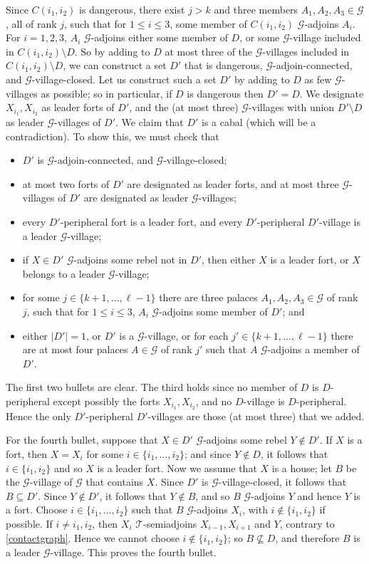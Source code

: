 \documentclass[titlepage,11pt]{article}
\def\LL{,\ldots,}
\newcommand{\mac}{\mathcal}
\begin{document}
	Since $C(i_1,i_2)$ is dangerous, there exist $j>k$ and three members $A_1,A_2,A_3\in \mac G$, all of rank $j$, such that for $1\le i\le 3$, some member of $C(i_1,i_2)$
	$\mac G$-adjoins  $A_i$.
	For $i = 1,2,3$, $A_i$ $\mac G$-adjoins either some member of $D$, or some $\mac G$-village
	included in $C(i_1,i_2)\setminus D$.
	So by adding to $D$ at most three of the $\mac G$-villages included in $C(i_1,i_2)\setminus D$, we can construct  a set $D'$ that is dangerous,
	$\mac G$-adjoin-connected, and $\mac G$-village-closed. Let us construct such a set $D'$ by adding to $D$ as few $\mac G$-villages as possible;  so in particular, if $D$ is dangerous then $D'=D$.
	We designate $X_{i_1}, X_{i_2}$ as leader forts of $D'$, and the (at most three) $\mac G$-villages with union $D'\setminus D$ as leader $\mac G$-villages of $D'$.
	We claim that $D'$ is a cabal (which will be a contradiction). To show this, we must check that
	\begin{itemize}
		\item $D'$ is $\mac G$-adjoin-connected, and $\mac G$-village-closed;
		\item at most two forts of $D'$ are designated as leader forts, and at most three $\mac G$-villages of $D'$ are designated as
		leader $\mac G$-villages;
		\item every $D'$-peripheral fort is a leader fort, and every $D'$-peripheral $D'$-village is a leader $\mac G$-village;
		\item if $X\in D'$ $\mac G$-adjoins some rebel not in $D'$, then either $X$ is a leader fort, or $X$ belongs to a leader $\mac G$-village;
		\item for some $j\in \{k+1\LL \ell-1\}$ there are three palaces $A_1,A_2,A_3\in \mac G$ of rank $j$, such that for $1\le i\le 3$,
		$A_i$ $\mac G$-adjoins some member of $D'$; and
		\item either $|D'|=1$, or $D'$ is a $\mac G$-village, or for each $j'\in \{k+1\LL \ell-1\}$ there are at most four palaces $A\in \mac G$ of rank $j'$ such that
		$A$ $\mac G$-adjoins a member of $D'$.
	\end{itemize}
	The first two bullets are clear.
	The third holds since no member of $D$ is $D$-peripheral except possibly the forts $X_{i_1}, X_{i_2}$, and no $D$-village is $D$-peripheral. Hence the only $D'$-peripheral $D'$-villages are those (at most three) that we added.
	
	For the fourth bullet, suppose that $X\in D'$ $\mac G$-adjoins some rebel $Y\notin D'$.
	If $X$ is a fort, then $X=X_i$ for some $i\in \{i_1\LL i_2\}$; and since $Y\notin D$, it follows that $i\in\{i_1,i_2\}$  and so $X$ is a leader fort.
	Now we assume that $X$ is a house;  let $B$ be the $\mac G$-village of $\mac G$ that contains $X$. Since $D'$
	is $\mac G$-village-closed, it follows that $B\subseteq D'$. Since $Y\notin D'$, it follows that $Y\notin B$, and so $B$ $\mac G$-adjoins $Y$ and hence $Y$
	is a fort. Choose $i\in \{i_1\LL i_2\}$ such that $B$ $\mac G$-adjoins $X_i$, with $i\notin \{i_1,i_2\}$ if possible.
	If $i\ne i_1,i_2$, then $X_i$ $\mac T$-semiadjoins $X_{i-1}, X_{i+1}$ and $Y$, contrary to \ref{contactgraph}.
	Hence we cannot choose $i\notin \{i_1,i_2\}$; so $B\not\subseteq D$, and therefore $B$ is a leader $\mac G$-village.
	This proves the fourth bullet.
	
\end{document}
